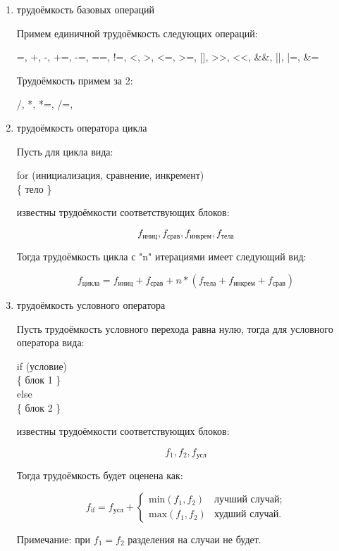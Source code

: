 \begin{enumerate}

\item трудоёмкость базовых операций

Примем единичной трудоёмкость следующих операций:

=, +, -, +=, -=, ==, !=, <, >, <=, >=, [], >>, <<, \&\&, ||, |=, \&=

Трудоёмкость примем за 2:

/, *, *=, /=, %

\item трудоёмкость оператора цикла

Пусть для цикла вида:

for (инициализация, сравнение, инкремент)\\
\{ тело \}

известны трудоёмкости соответствующих блоков:

\[f_{\text{иниц}}, f_{\text{срав}}, f_{\text{инкрем}}, f_{\text{тела}} \]

Тогда трудоёмкость цикла с "n" итерациями имеет следующий вид:

\begin{equation}
    f_{\text{цикла}} = f_{\text{иниц}} + f_{\text{срав}} + n * (f_{\text{тела}} + f_{\text{инкрем}} + f_{\text{срав}})
\end{equation}


\item трудоёмкость условного оператора

Пусть трудоёмкость условного перехода равна нулю, тогда для условного оператора вида:

if (условие)\\
\{ блок 1 \}\\
else \\
\{ блок 2 \}

известны трудоёмкости соответствующих блоков:

\[f_1, f_2, f_{\text{усл}}\]

Тогда трудоёмкость будет оценена как:

\begin{equation}
    f_{\text{if}} = f_{\text{усл}} + 
    \begin{cases}
      \text{min}(f_1, f_2) & \text{лучший случай}; \\
      \text{max}(f_1, f_2) & \text{худший случай}.
    \end{cases}
\end{equation}

Примечание: при $f_1 = f_2$ разделения на случаи не будет.

\end{enumerate}


